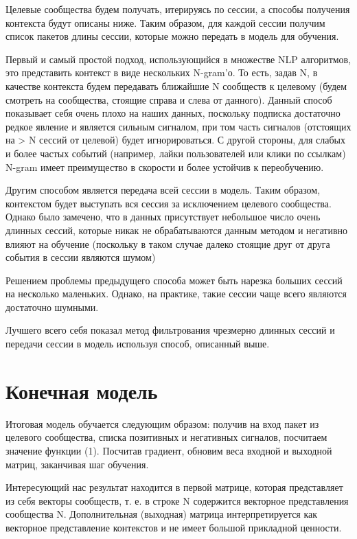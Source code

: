 \documentclass[times,specification,annotation]{itmo-student-thesis}
\begin{document}
Целевые сообщества будем получать, итерируясь по сессии, а способы
получения контекста будут описаны ниже. Таким образом, для каждой сессии
получим список пакетов длины сессии, которые можно передать в модель для
обучения.

Первый и самый простой подход, использующийся в множестве NLP
алгоритмов, это представить контекст в виде нескольких N-gram’о. То есть, задав
N, в качестве контекста будем передавать ближайшие N сообществ к целевому
(будем смотреть на сообщества, стоящие справа и слева от данного). Данный
способ показывает себя очень плохо на наших данных, поскольку подписка
достаточно редкое явление и является сильным сигналом, при том часть сигналов
(отстоящих на > N сессий от целевой) будет игнорироваться. С другой стороны,
для слабых и более частых событий (например, лайки пользователей или клики по
ссылкам) N-gram имеет преимущество в скорости и более устойчив к
переобучению.

Другим способом является передача всей сессии в модель. Таким образом,
контекстом будет выступать вся сессия за исключением целевого сообщества.
Однако было замечено, что в данных присутствует небольшое число очень
длинных сессий, которые никак не обрабатываются данным методом и негативно
влияют на обучение (поскольку в таком случае далеко стоящие друг от друга
события в сессии являются шумом)

Решением проблемы предыдущего способа может быть нарезка больших
сессий на несколько маленьких. Однако, на практике, такие сессии чаще всего
являются достаточно шумными.

Лучшего всего себя показал метод фильтрования чрезмерно длинных сессий
и передачи сессии в модель используя способ, описанный выше.

\section{Конечная модель}

Итоговая модель обучается следующим образом: получив на вход пакет из
целевого сообщества, списка позитивных и негативных сигналов, посчитаем
значение функции (1). Посчитав градиент, обновим веса входной и выходной
матриц, заканчивая шаг обучения.

Интересующий нас результат находится в первой матрице, которая
представляет из себя векторы сообществ, т. е. в строке N содержится векторное
представления сообщества N. Дополнительная (выходная) матрица
интерпретируется как векторное представление контекстов и не имеет большой
прикладной ценности.
\end{document}
